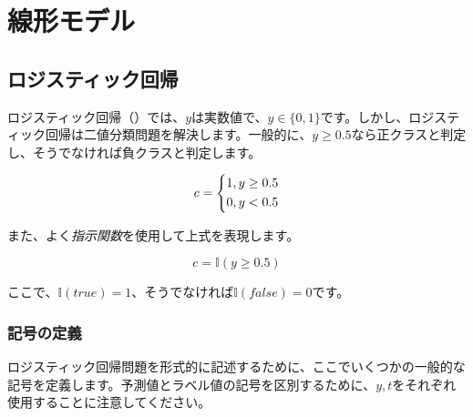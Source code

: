 \begin{savequote}[45mm]
\end{savequote}

\chapter{線形モデル}
\label{ch:linear-model}

\section{ロジスティック回帰}

\begin{content}

ロジスティック回帰（）では、$y$は実数値で、$y \in \{ 0,1\}$です。しかし、ロジスティック回帰は二値分類問題を解決します。一般的に、$y \ge 0.5$なら正クラスと判定し、そうでなければ負クラスと判定します。

\[c = \left\{ \begin{gathered}
  1,y \ge 0.5 \hfill \\
  0,y < 0.5 \hfill \\ 
\end{gathered}  \right.\]

また、よく\emph{指示関数}を使用して上式を表現します。

\[
c = \mathbb I(y \ge 0.5)
\]

ここで、$\mathbb I(true) = 1$、そうでなければ$\mathbb I(false) = 0$です。

\subsection{記号の定義}

ロジスティック回帰問題を形式的に記述するために、ここでいくつかの一般的な記号を定義します。予測値とラベル値の記号を区別するために、$y, t$をそれぞれ使用することに注意してください。


\end{content}
